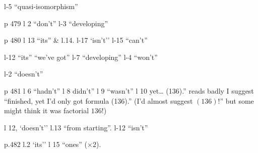 l-5 ``quasi-isomorphism''

p 479 l 2 ``don't'' \quad l-3 ``developing''

p 480 l 13 ``its'' \& l.14. \quad l-17 `isn't'' \quad l-15 ``can't''

l-12 ``its'' ``we've got'' \quad l-7 ``developing'' \quad l-4 ``won't''

l-2 ``doesn't''

p 481 l 6 ``hadn't'' \quad l 8 didn't'' \quad l 9 ``wasn't'' \quad l 10 yet\ldots{} (136).'' reads badly I suggest ``finished, yet I'd only got  formula (136).'' (I'd almost suggest $(136)!$'' but some might think it was factorial $136!$)

l 12, `doesn't'' \quad l.13 ``from starting''. \quad l-12 ``isn't''

p.482 l.2 `its'' \quad l 15 ``ones'' ($\times 2$).
